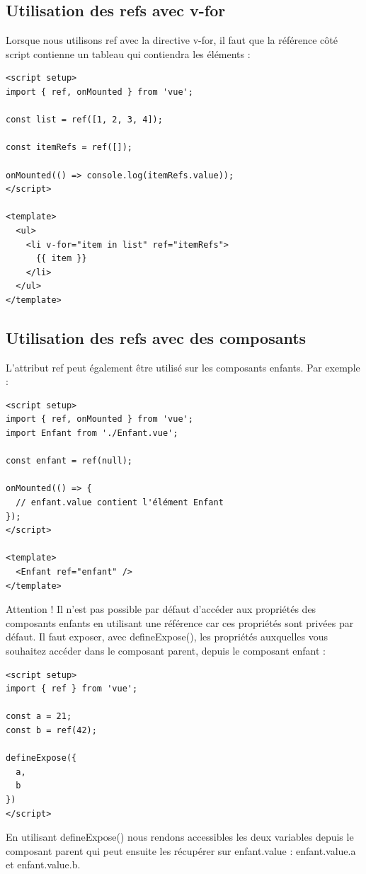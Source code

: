 \documentclass{article}
\begin{document}
\subsection{Utilisation des {\color{monOrange}refs} avec {\color{monOrange}v-for}}
Lorsque nous utilisons {\color{monOrange}ref} avec la directive {\color{monOrange}v-for}, il faut que la référence côté {\color{monOrange}script} contienne un tableau qui contiendra les éléments :
\begin{verbatim}
<script setup>
import { ref, onMounted } from 'vue';

const list = ref([1, 2, 3, 4]);

const itemRefs = ref([]);

onMounted(() => console.log(itemRefs.value));
</script>

<template>
  <ul>
    <li v-for="item in list" ref="itemRefs">
      {{ item }}
    </li>
  </ul>
</template>
\end{verbatim}

\subsection{Utilisation des {\color{monOrange}refs} avec des composants}
L'attribut {\color{monOrange}ref} peut également être utilisé sur les composants enfants. Par exemple :
\begin{verbatim}
<script setup>
import { ref, onMounted } from 'vue';
import Enfant from './Enfant.vue';

const enfant = ref(null);

onMounted(() => {
  // enfant.value contient l'élément Enfant
});
</script>

<template>
  <Enfant ref="enfant" />
</template>
\end{verbatim}
Attention ! Il n'est pas possible par défaut d'accéder aux propriétés des composants enfants en utilisant une référence car ces propriétés sont privées par défaut. Il faut exposer, avec {\color{monOrange}defineExpose()}, les propriétés auxquelles vous souhaitez accéder dans le composant parent, depuis le composant enfant :
\begin{verbatim}
<script setup>
import { ref } from 'vue';

const a = 21;
const b = ref(42);

defineExpose({
  a,
  b
})
</script>
\end{verbatim}
En utilisant {\color{monOrange}defineExpose()} nous rendons accessibles les deux variables depuis le composant parent qui peut ensuite les récupérer sur {\color{monOrange}enfant.value : enfant.value.a et enfant.value.b}.
\end{document}
